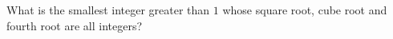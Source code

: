 What is the smallest integer greater than $1$ whose square root, cube root and fourth root are all integers?
